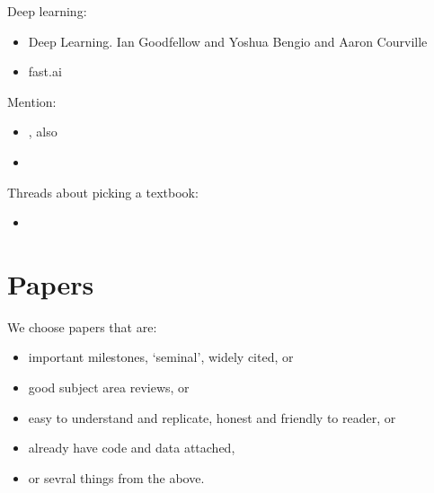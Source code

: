 \documentclass[letterpaper,10pt,english]{sphinxmanual}
\begin{document}
Deep learning:
\begin{itemize}
\item {} 
Deep Learning. Ian Goodfellow and Yoshua Bengio and Aaron Courville

\item {} 
fast.ai

\end{itemize}

Mention:
\begin{itemize}
\item {} 
, also 

\item {} 

\end{itemize}

Threads about picking a textbook:
\begin{itemize}
\item {} 

\end{itemize}


\section{Papers}
\label{\detokenize{references:papers}}
We choose papers that are:
\begin{itemize}
\item {} 
important milestones, ‘seminal’, widely cited, or

\item {} 
good subject area reviews, or

\item {} 
easy to understand and replicate, honest and friendly to reader, or

\item {} 
already have code and data attached,

\item {} 
or sevral things from the above.

\end{itemize}
\end{document}
